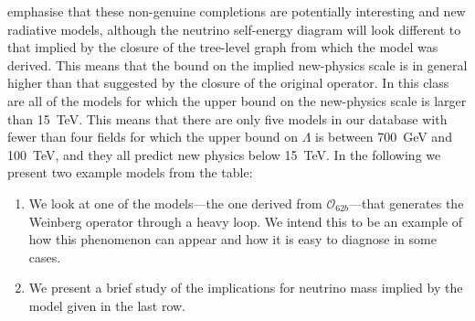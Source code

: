 emphasise that these non-genuine completions are potentially interesting and new
radiative models, although the neutrino self-energy diagram will look different
to that implied by the closure of the tree-level graph from which the model was
derived. This means that the bound on the implied new-physics scale is in
general higher than that suggested by the closure of the original operator. In
this class are all of the models for which the upper bound on the new-physics
scale is larger than \SI{15}{\TeV}. This means that there are only five models
in our database with fewer than four fields for which the upper bound on
$\Lambda$ is between \SI{700}{\GeV} and \SI{100}{\TeV}, and they all predict new
physics below \SI{15}{\TeV}. In the following we present two example models from
the table:
\begin{enumerate}
  \item We look at one of the models---the one derived from
    $\mathcal{O}_{62b}$---that generates the Weinberg operator through a heavy
    loop. We intend this to be an example of how this phenomenon can appear and
    how it is easy to diagnose in some cases.
  \item We present a brief study of the implications for neutrino mass implied
    by the model given in the last row.
\end{enumerate}

